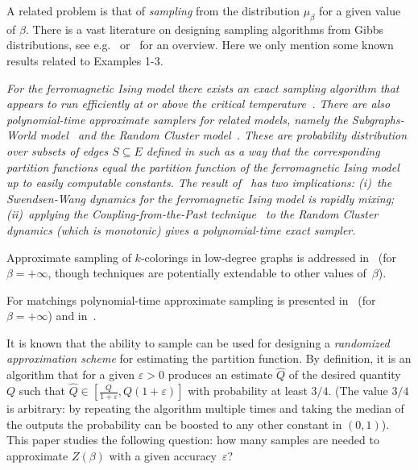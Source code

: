 \documentclass[final,12pt]{colt2018}
\def\myparagraph#1{\vspace{2pt}\noindent{\bf #1~~}}
\begin{document}
A related problem is that of {\em sampling} from the distribution $\mu_\beta$ for a given
value of $\beta$. There is a vast literature on designing sampling algorithms from Gibbs distributions,
see e.g.~\citep{Metropolis,SwendsenWang,Huber:AAP04,FillHuber:Vervaat} or~\citep{MCMC:handbook} for an overview.
Here we only mention some known results related to Examples 1-3. 

\em
\myparagraph{(1)} For the ferromagnetic Ising model there exists an exact sampling algorithm that appears to run efficiently at or above the {\em critical temperature}~\citep{ProppWilson:96}.
There are also polynomial-time approximate samplers for related models, namely the {\em Subgraphs-World model}~\citep{JerrumSinclair:Ising} and 
the {\em Random Cluster model}~\citep{GuoJerrum:18}. These are probability distribution over subsets of edges $S\subseteq E$
defined in such as a way that the corresponding partition functions equal the partition function of the ferromagnetic Ising model
up to easily computable constants. The result of~\cite{GuoJerrum:18} has two implications:
(i)~the Swendsen-Wang dynamics for the ferromagnetic Ising model is rapidly mixing;
(ii)~applying the Coupling-from-the-Past technique~\citep{ProppWilson:96} to
the Random Cluster dynamics (which is monotonic) gives
a polynomial-time exact sampler.

\myparagraph{(2)} Approximate sampling of $k$-colorings in low-degree graphs is addressed in~\citep{Jerrum:colorings,Vigoda:colorings}
(for $\beta=+\infty$, though techniques are potentially extendable to other values of~$\beta$).

\myparagraph{(3)} For matchings polynomial-time approximate sampling is presented in~\citep{JerrumSinclair:permanent} (for $\beta=+\infty$) and in~\cite[Section 2.3.5]{Matthews:PhD}.
\em

It is known that the ability to sample can be used for designing
a {\em randomized
approximation scheme} for estimating the partition function. By definition, it is an algorithm that for a given $\varepsilon>0$ produces an estimate $\hat Q$ of the desired quantity $Q$ such
that $\hat Q\in\left[\frac{Q}{1+\varepsilon},Q(1+\varepsilon)\right]$ with probability at least $3/4$.
(The value $3/4$ is arbitrary: by repeating the algorithm multiple times and
taking the median of the outputs the probability can be boosted to any other constant in $(0,1)$).
This paper studies the following question: how many samples are needed to approximate $Z(\beta)$ with a given accuracy~$\varepsilon$?
\end{document}
